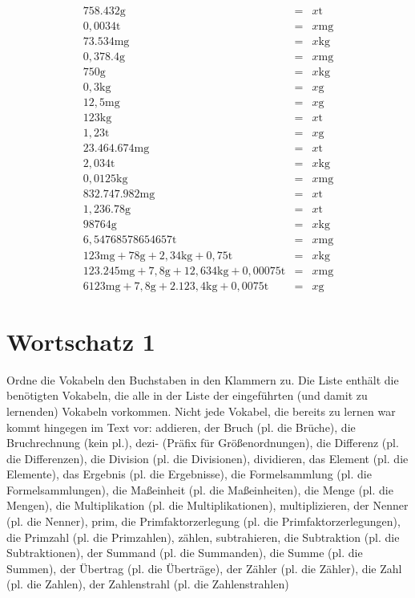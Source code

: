 \documentclass[a4paper]{book}%
\theoremstyle{definition}
\begin{document}
\begin{eqnarray}
    758.432 \text{g} &=& x \text{t} \\
    0,0034 \text{t} &=& x \text{mg} \\
    73.534 \text{mg} &=& x \text{kg} \\
    0,378.4 \text{g} &=& x \text{mg} \\
    750 \text{g} &=& x \text{kg} \\
    0,3 \text{kg} &=& x \text{g} \\
    12,5 \text{mg} &=& x \text{g} \\
    123 \text{kg} &=& x \text{t} \\
    1,23 \text{t} &=& x \text{g} \\
    23.464.674 \text{mg} &=& x \text{t} \\
    2,034 \text{t} &=& x \text{kg} \\
    0,0125 \text{kg} &=& x \text{mg} \\
  832.747.982\text{mg} &=& x \text{t} \\
  1,236.78 \text{g} &=& x \text{t} \\
  98764\text{g} &=& x \text{kg} \\
  6,54768578654657\text{t} &=& x \text{mg} \\
  123 \text{mg} + 78 \text{g} + 2,34 \text{kg} + 0,75 \text{t} &=& x \text{kg} \\
  123.245 \text{mg} + 7,8 \text{g} + 12,634 \text{kg} + 0,00075 \text{t} &=& x \text{mg} \\
  6123 \text{mg} + 7,8 \text{g} + 2.123,4 \text{kg} + 0,0075 \text{t} &=& x \text{g}
\end{eqnarray}


\newpage
\section{Wortschatz 1}

Ordne die Vokabeln den Buchstaben in den Klammern zu. Die Liste enthält die benötigten Vokabeln, die alle in der Liste der eingeführten (und damit zu lernenden) Vokabeln vorkommen. Nicht jede Vokabel, die bereits zu lernen war kommt hingegen im Text vor:
addieren,
der Bruch (pl. die Brüche),
die Bruchrechnung (kein pl.),
dezi- (Präfix für Größenordnungen),
die Differenz (pl. die Differenzen),
die Division (pl. die Divisionen),
dividieren,
das Element (pl. die Elemente),
das Ergebnis (pl. die Ergebnisse),
die Formelsammlung (pl. die Formelsammlungen),
die Maßeinheit (pl. die Maßeinheiten),
die Menge (pl. die Mengen),
die Multiplikation (pl. die Multiplikationen),
multiplizieren,
der Nenner (pl. die Nenner),
prim,
die Primfaktorzerlegung (pl. die Primfaktorzerlegungen),
die Primzahl (pl. die Primzahlen),
zählen,
subtrahieren,
die Subtraktion (pl. die Subtraktionen),
der Summand (pl. die Summanden),
die Summe (pl. die Summen),
der Übertrag (pl. die Überträge),
der Zähler (pl. die Zähler),
die Zahl (pl. die Zahlen),
der Zahlenstrahl (pl. die Zahlenstrahlen)
\end{document}

